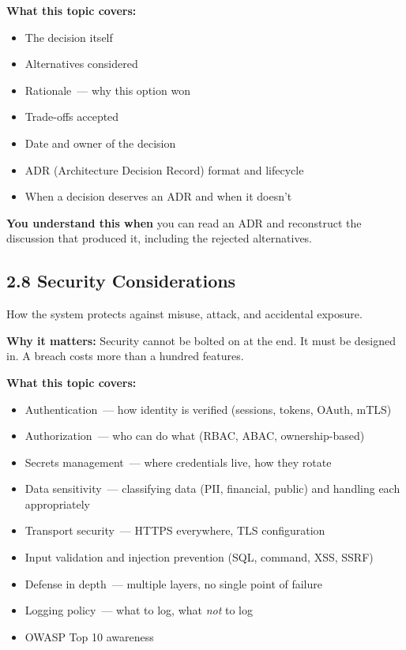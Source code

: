\textbf{What this topic covers:}

\begin{itemize}
\tightlist
\item
  The decision itself
\item
  Alternatives considered
\item
  Rationale~--- why this option won
\item
  Trade-offs accepted
\item
  Date and owner of the decision
\item
  ADR (Architecture Decision Record) format and lifecycle
\item
  When a decision deserves an ADR and when it doesn't
\end{itemize}

\noindent{}\textbf{You understand this when} you can read an ADR and reconstruct the discussion that produced it, including the rejected alternatives.

\subsection*{2.8 Security Considerations}\label{project-planning-guide:28-security-considerations}

How the system protects against misuse, attack, and accidental exposure.

\textbf{Why it matters:} Security cannot be bolted on at the end. It must be designed in. A breach costs more than a hundred features.

\textbf{What this topic covers:}

\begin{itemize}
\tightlist
\item
  Authentication~--- how identity is verified (sessions, tokens, OAuth, mTLS)
\item
  Authorization~--- who can do what (RBAC, ABAC, ownership-based)
\item
  Secrets management~--- where credentials live, how they rotate
\item
  Data sensitivity~--- classifying data (PII, financial, public) and handling each appropriately
\item
  Transport security~--- HTTPS everywhere, TLS configuration
\item
  Input validation and injection prevention (SQL, command, XSS, SSRF)
\item
  Defense in depth~--- multiple layers, no single point of failure
\item
  Logging policy~--- what to log, what \emph{not} to log
\item
  OWASP Top 10 awareness
\end{itemize}

